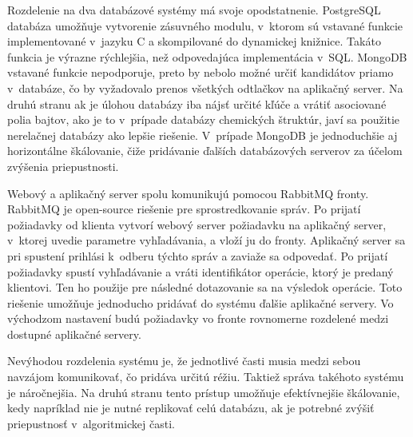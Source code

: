 \documentclass[slovak]{ExcelAtFIT} %
\begin{document}
Rozdelenie na dva databázové systémy má svoje opodstatnenie. PostgreSQL databáza umožňuje vytvorenie zásuvného modulu, v~ktorom sú vstavané funkcie implementované v~jazyku C a skompilované do dynamickej knižnice. Takáto funkcia je výrazne rýchlejšia, než odpovedajúca implementácia v~SQL. MongoDB vstavané funkcie nepodporuje, preto by nebolo možné určiť kandidátov priamo v~databáze, čo by vyžadovalo prenos všetkých odtlačkov na aplikačný server. Na druhú stranu ak je úlohou databázy iba nájsť určité kľúče a vrátiť asociované polia bajtov, ako je to v~prípade databázy chemických štruktúr, javí sa použitie nerelačnej databázy ako lepšie riešenie. V~prípade MongoDB je jednoduchšie aj horizontálne škálovanie, čiže pridávanie ďalších databázových serverov za účelom zvýšenia priepustnosti.

Webový a aplikačný server spolu komunikujú pomocou RabbitMQ fronty. RabbitMQ je open-source riešenie pre sprostredkovanie správ. Po prijatí po\-žia\-dav\-ky od klienta vytvorí webový server požiadavku na aplikačný server, v~ktorej uvedie parametre vy\-hľa\-dá\-va\-nia, a vloží ju do fronty. Aplikačný server sa pri spustení prihlási k~odberu týchto správ a zaviaže sa odpovedať. Po prijatí požiadavky spustí vyhľadávanie a vráti identifikátor operácie, ktorý je predaný klientovi. Ten ho použije pre následné dotazovanie sa na výsledok operácie. Toto riešenie umožňuje jednoducho pridávať do systému ďalšie aplikačné servery. Vo východzom nastavení budú požiadavky vo fronte rovnomerne rozdelené medzi dostupné aplikačné servery.

Nevýhodou rozdelenia systému je, že jednotlivé časti musia medzi sebou navzájom komunikovať, čo pridáva určitú réžiu. Taktiež správa takéhoto systému je náročnejšia. Na druhú stranu tento prístup umožňuje efektívnejšie škálovanie, kedy napríklad nie je nutné replikovať celú databázu, ak je potrebné zvýšiť priepustnosť v~algoritmickej časti.  
\end{document}
